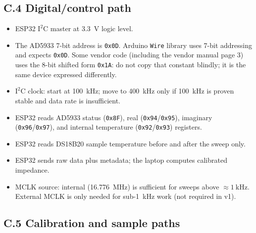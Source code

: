 \documentclass[11pt,a4paper]{article}
\begin{document}
\subsection{C.4 Digital/control path}

\begin{itemize}
\item ESP32 $\mathrm{I^2C}$ master at \SI{3.3}{\volt} logic level.
\item The AD5933 7-bit address is \texttt{0x0D}. Arduino \texttt{Wire} library uses 7-bit addressing and expects \texttt{0x0D}. Some vendor code (including the vendor manual page 3) uses the 8-bit shifted form \texttt{0x1A}: do not copy that constant blindly; it is the same device expressed differently.
\item $\mathrm{I^2C}$ clock: start at \SI{100}{\kilo\hertz}; move to \SI{400}{\kilo\hertz} only if \SI{100}{\kilo\hertz} is proven stable and data rate is insufficient.
\item ESP32 reads AD5933 status (\texttt{0x8F}), real (\texttt{0x94}/\texttt{0x95}), imaginary (\texttt{0x96}/\texttt{0x97}), and internal temperature (\texttt{0x92}/\texttt{0x93}) registers.
\item ESP32 reads DS18B20 sample temperature before and after the sweep only.
\item ESP32 sends raw data plus metadata; the laptop computes calibrated impedance.
\item MCLK source: internal (\SI{16.776}{\mega\hertz}) is sufficient for sweeps above $\approx \SI{1}{\kilo\hertz}$. External MCLK is only needed for sub-\SI{1}{\kilo\hertz} work (not required in v1).
\end{itemize}

\subsection{C.5 Calibration and sample paths}
\end{document}
